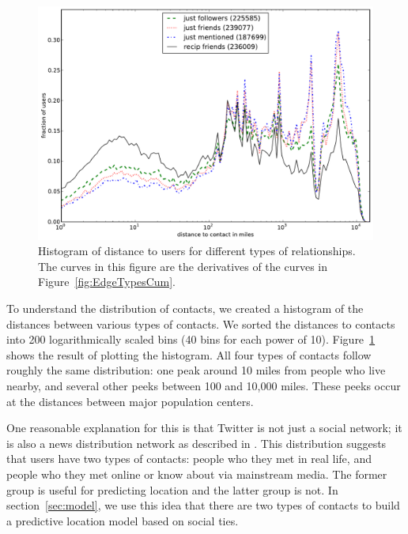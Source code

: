 \begin{figure}[tb]
\centering
\includegraphics[width=\linewidth]{figures/edge_types_norm.pdf}
\caption{
Histogram of distance to users for different types of relationships.
The curves in this figure are the derivatives of the curves in
Figure~\ref{fig:EdgeTypesCum}.
}
\label{fig:EdgeTypes}
\end{figure}

To understand the distribution of contacts, we created a histogram of the distances between various types of contacts.
We sorted the distances to contacts into 200 logarithmically
scaled bins (40 bins for each power of 10).
Figure~\ref{fig:EdgeTypes} shows the result of plotting the histogram.
%
All four types of contacts follow roughly the same
distribution: one peak around 10 miles from people who live nearby, and several
other peeks between 100 and 10,000 miles. These peeks occur at the distances
between major population centers.


One reasonable explanation for this is that Twitter is not just a social
network; it is also a news distribution network as described in
\cite{kwak2010why}.
This distribution suggests that users have two types of contacts: people who
they met in real life, and people who they met online or know about via
mainstream media.
%
The former group is useful for predicting location and the latter group is not.
%
In section~\ref{sec:model}, we use this idea that there are two types of
contacts to build a predictive location model based on social ties.


